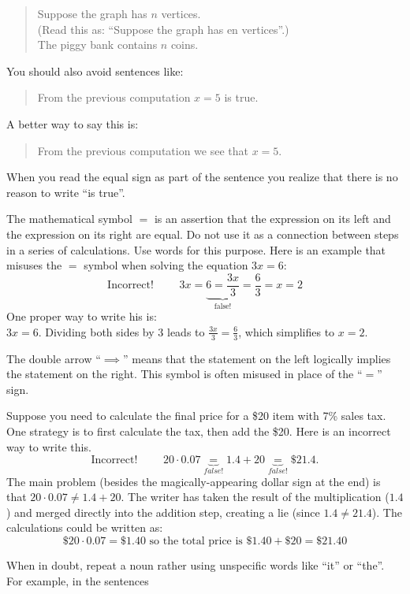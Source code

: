 \documentclass[
]{book}
\theoremstyle{definition}
\theoremstyle{definition}
\theoremstyle{definition}
\theoremstyle{remark}
\begin{document}
\begin{description}
\begin{quote}
Suppose the graph has \(n\) vertices.\\
(Read this as: ``Suppose the graph has en vertices''.)\\
The piggy bank contains \(n\) coins.
\end{quote}

You should also avoid sentences like:

\begin{quote}
From the previous computation \(x=5\) is true.
\end{quote}

A better way to say this is:

\begin{quote}
From the previous computation we see that \(x=5\).
\end{quote}

When you read the equal sign as part of the sentence you realize
that there is no reason to write ``is true''.
\item[\(=\) is NOT a conjunction:]
The mathematical symbol \(=\) is an assertion that the expression on
its left and the expression on its right are equal. Do not use it as
a connection between steps in a series of calculations. Use words
for this purpose. Here is an example that misuses the \(=\) symbol
when solving the equation \(3x=6\):
\[\text{Incorrect! } \qquad 3x = \underbrace{6 =
            \frac{3x}{3}}_{\text{false!}} = \frac{6}{3} = x = 2\]
One proper way to write his is:\\
\(3x=6\). Dividing both sides by \(3\) leads to \(\frac{3x}{3} =  \frac{6}{3}\), which simplifies to \(x=2\).
\item[``\(\implies\)'' means ``implies'':]
The double arrow ``\(\implies\)'' means that the statement on the left
logically implies the statement on the right. This symbol is often
misused in place of the ``\(=\)'' sign.
\item[Do not merge steps:]
Suppose you need to calculate the final price for a \$20 item with
7\% sales tax. One strategy is to first calculate the tax, then add
the \$20. Here is an incorrect way to write this.\\
\[\text{Incorrect! } \qquad  20 \cdot 0.07 \underbrace{=}_{false!} 1.4 +
            20 \underbrace{=}_{false!} \$21.4.\] The main problem
(besides the magically-appearing dollar sign at the end) is that
\(20 \cdot 0.07 \neq 1.4 + 20\). The writer has taken the result of
the multiplication (\(1.4\)) and merged directly into the addition
step, creating a lie (since \(1.4\neq 21.4\)). The calculations could
be written as:
\[\$20 \cdot 0.07 = \$1.40 \text{ so the total price is } \$1.40 + \$20 = \$21.40\]
\item[Avoid ambiguity:]
When in doubt, repeat a noun rather using unspecific words like ``it''
or ``the''. For example, in the sentences


\end{description}
\end{document}
